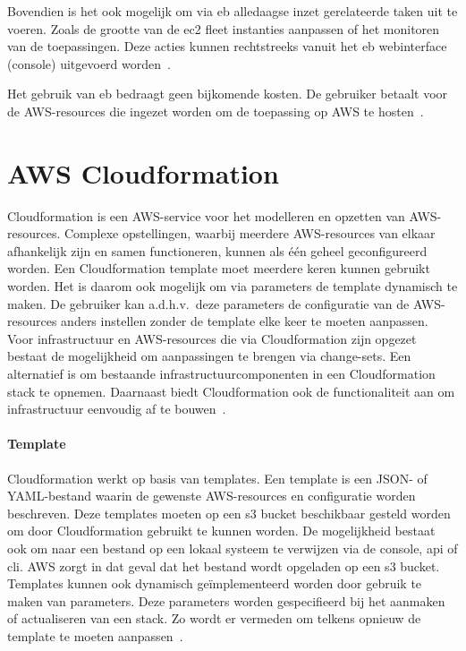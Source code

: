 Bovendien is het ook mogelijk om via \acrshort{eb} alledaagse inzet gerelateerde taken uit te voeren.
Zoals de grootte van de \acrshort{ec2} fleet instanties aanpassen of het monitoren van de toepassingen.
Deze acties kunnen rechtstreeks vanuit het \acrshort{eb} webinterface (console) uitgevoerd worden~\autocite{Khen2022a}.

Het gebruik van \acrlong{eb} bedraagt geen bijkomende kosten.
De gebruiker betaalt voor de AWS-resources die ingezet worden om de toepassing op AWS te hosten~\autocite{Khen2022a}.

\section{AWS Cloudformation}
\label{subsec:service-cloudformation}

Cloudformation is een AWS-service voor het modelleren en opzetten van AWS-resources.
Complexe opstellingen, waarbij meerdere AWS-resources van elkaar afhankelijk zijn en samen functioneren, kunnen als één geheel geconfigureerd worden.
Een Cloudformation template moet meerdere keren kunnen gebruikt worden.
Het is daarom ook mogelijk om via parameters de template dynamisch te maken.
De gebruiker kan a.d.h.v.\ deze parameters de configuratie van de AWS-resources anders instellen zonder de template elke keer te moeten aanpassen.
Voor infrastructuur en AWS-resources die via Cloudformation zijn opgezet bestaat de mogelijkheid om aanpassingen te brengen via change-sets.
Een alternatief is om bestaande infrastructuurcomponenten in een Cloudformation stack te opnemen.
Daarnaast biedt Cloudformation ook de functionaliteit aan om infrastructuur eenvoudig af te bouwen~\autocite{Mansoor2014}.

\paragraph{Template}

Cloudformation werkt op basis van templates.
Een template is een JSON- of YAML-bestand waarin de gewenste AWS-resources en configuratie worden beschreven.
Deze templates moeten op een \acrshort{s3} bucket beschikbaar gesteld worden om door Cloudformation gebruikt te kunnen worden.
De mogelijkheid bestaat ook om naar een bestand op een lokaal systeem te verwijzen via de console, \acrshort{api} of \acrshort{cli}.
AWS zorgt in dat geval dat het bestand wordt opgeladen op een \acrshort{s3} bucket.
Templates kunnen ook dynamisch geïmplementeerd worden door gebruik te maken van parameters.
Deze parameters worden gespecifieerd bij het aanmaken of actualiseren van een stack.
Zo wordt er vermeden om telkens opnieuw de template te moeten aanpassen~\autocite{AWSCLoudformationUser}.

